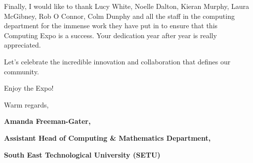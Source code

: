 \documentclass{report}
\begin{document}
\WELCOMEPARSKIP
Finally, I would like to thank Lucy White, Noelle Dalton, Kieran Murphy, Laura McGibney, Rob O Connor, Colm Dunphy and all the staff in the computing department for the immense work they have put in to ensure that this Computing Expo is a success. Your dedication year after year is really appreciated.

\WELCOMEPARSKIP
Let’s celebrate the incredible innovation and collaboration that defines our community. 

\WELCOMEPARSKIP
Enjoy the Expo!

\WELCOMEPARSKIP
Warm regards,

\vspace{-12pt}
\begin{flushright}
\textbf{Amanda Freeman-Gater,}

\textbf{Assistant Head of Computing \& Mathematics Department,}

\textbf{South East Technological University (SETU)}
\end{flushright}

\clearpage
\end{document}
